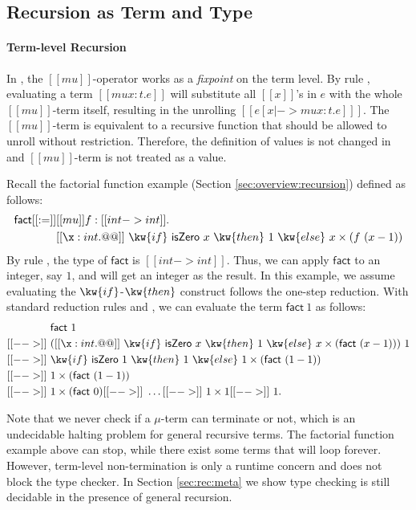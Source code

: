 \subsection{Recursion as Term and Type}
\label{subsec:recur}
\paragraph{Term-level Recursion}

In \name, the $[[mu]]$-operator works as a \emph{fixpoint} on the term
level. By rule , evaluating a term $[[mu x:t.e]]$ will
substitute all $[[x]]$'s in $e$ with the whole $[[mu]]$-term itself,
resulting in the unrolling $[[e [x |-> mu x:t.e] ]]$. The
$[[mu]]$-term is equivalent to a recursive function that should be
allowed to unroll without restriction. Therefore, the definition of
values is not changed in \name and $[[mu]]$-term is not treated as a
value. 

Recall the factorial function example (Section
\ref{sec:overview:recursion}) defined as follows:
\begin{align*}
    \mathsf{fact} [[:=]] &[[mu]] f : [[int -> int]] . \\ &[[\x : int
        . @@]]~\kw{if}~\textsf{isZero}~x~\kw{then}~1~\kw{else}~x \times (f~(x
    - 1))
\end{align*}
By rule , the type of $\mathsf{fact}$ is $[[int ->
    int]]$. Thus, we can apply $\mathsf{fact}$ to an integer, say $1$,
and will get an integer as the result. In this example, we assume
evaluating the $\kw{if}$-$\kw{then}$ construct follows the one-step
reduction. With standard reduction rules  and
, we can evaluate the term $\mathsf{fact}~1$ as
follows:
\begin{align*}
    &\mathsf{fact}~1 \\ [[-->]]~& ([[\x : int . @@]]~\kw{if}~
  \textsf{isZero}~x~\kw{then}~1~\kw{else}~x \times (\mathsf{fact}~(x - 1)))~1
  \\ [[-->]]~ & \kw{if}~\textsf{isZero}~1~\kw{then}~1~\kw{else}~1 \times
  (\mathsf{fact}~(1 - 1)) \\ [[-->]]~& 1 \times (\mathsf{fact}~(1-1))
  \\ [[-->]]~& 1 \times (\mathsf{fact}~0) [[-->]]~ \dots [[-->]]~ 1 \times
  1 [[-->]]~ 1. 
\end{align*}

Note that we never check if a $\mu$-term can terminate or not, which
is an undecidable halting problem for general recursive terms. The
factorial function example above can stop, while there exist some
terms that will loop forever. However, term-level non-termination is
only a runtime concern and does not block the type checker. In Section
\ref{sec:rec:meta} we show type checking \name is still decidable
in the presence of general recursion.

